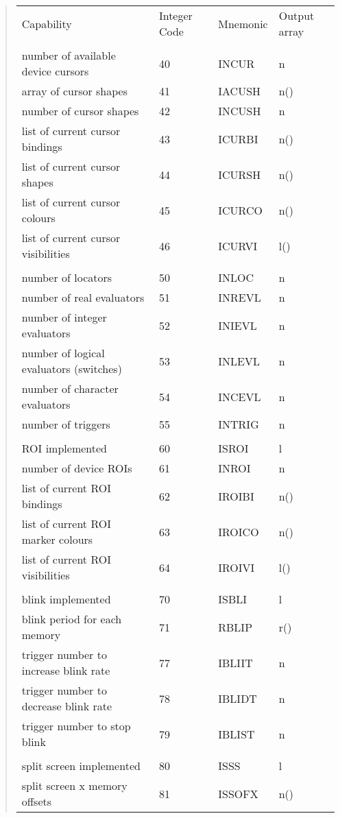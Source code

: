 \documentclass[11pt,nolof]{starlink}
\begin{document}
\begin{quote}
\begin{tabular}{llll}
Capability & Integer Code & Mnemonic & Output array \\
\\
number of available device cursors & 40 & INCUR & n \\
array of cursor shapes & 41 & IACUSH & n() \\
number of cursor shapes & 42 & INCUSH & n \\
list of current cursor bindings & 43 & ICURBI & n() \\
list of current cursor shapes & 44 & ICURSH & n() \\
list of current cursor colours & 45 & ICURCO & n() \\
list of current cursor visibilities & 46 & ICURVI & l() \\
\\
number of locators & 50 & INLOC & n \\
number of real evaluators & 51 & INREVL & n \\
number of integer evaluators & 52 & INIEVL & n \\
number of logical evaluators (switches) & 53 & INLEVL & n \\
number of character evaluators & 54 & INCEVL & n \\
number of triggers & 55 & INTRIG & n \\
\\
ROI implemented & 60 & ISROI & l \\
number of device ROIs & 61 & INROI & n \\
list of current ROI bindings & 62 & IROIBI & n() \\
list of current ROI marker colours & 63 & IROICO & n() \\
list of current ROI visibilities & 64 & IROIVI & l() \\
\\
blink implemented & 70 & ISBLI & l \\
blink period for each memory & 71 & RBLIP & r() \\
trigger number to increase blink rate & 77 & IBLIIT & n \\
trigger number to decrease blink rate & 78 & IBLIDT & n \\
trigger number to stop blink & 79 & IBLIST & n \\
\\
split screen implemented & 80 & ISSS & l \\
split screen x memory offsets & 81 & ISSOFX & n() \\

\end{tabular}
\end{quote}
\end{document}

